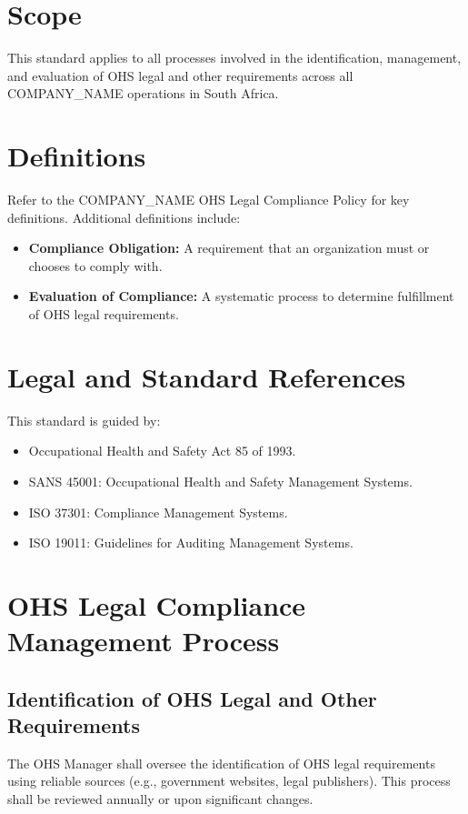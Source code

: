 \documentclass[12pt]{article}
\begin{document}
\section{Scope}
This standard applies to all processes involved in the identification, management, and evaluation of OHS legal and other requirements across all {{COMPANY_NAME}} operations in South Africa.

\section{Definitions}
Refer to the {{COMPANY_NAME}} OHS Legal Compliance Policy for key definitions. Additional definitions include:
\begin{itemize}
    \item \textbf{Compliance Obligation:} A requirement that an organization must or chooses to comply with.
    \item \textbf{Evaluation of Compliance:} A systematic process to determine fulfillment of OHS legal requirements.
\end{itemize}

\section{Legal and Standard References}
This standard is guided by:
\begin{itemize}
    \item Occupational Health and Safety Act 85 of 1993.
    \item SANS 45001: Occupational Health and Safety Management Systems.
    \item ISO 37301: Compliance Management Systems.
    \item ISO 19011: Guidelines for Auditing Management Systems.
\end{itemize}

\section{OHS Legal Compliance Management Process}

\subsection{Identification of OHS Legal and Other Requirements}
The OHS Manager shall oversee the identification of OHS legal requirements using reliable sources (e.g., government websites, legal publishers). This process shall be reviewed annually or upon significant changes.
\end{document}
